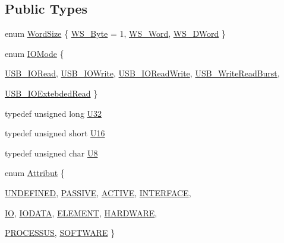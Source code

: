 \subsection*{Public Types}
\begin{DoxyCompactItemize}
\item 
enum \hyperlink{classUsbFTMLInterface_ae0f25daa336091a5acd548aef3e9b4b4}{WordSize} \{ \hyperlink{classUsbFTMLInterface_ae0f25daa336091a5acd548aef3e9b4b4a6d1f2c03dd60649290649efd7fb7f57d}{WS\_\-Byte} = 1, 
\hyperlink{classUsbFTMLInterface_ae0f25daa336091a5acd548aef3e9b4b4adcfe42e171e84db403d40614f2502f3e}{WS\_\-Word}, 
\hyperlink{classUsbFTMLInterface_ae0f25daa336091a5acd548aef3e9b4b4abff203c40a75d695acbf9190ae2dbe69}{WS\_\-DWord}
 \}
\item 
enum \hyperlink{classUsbFTMLInterface_a181227ebb27454964e5b6d185432498d}{IOMode} \{ \par
\hyperlink{classUsbFTMLInterface_a181227ebb27454964e5b6d185432498da71463bc1f4116a7456f7f298d030ecc7}{USB\_\-IORead}, 
\hyperlink{classUsbFTMLInterface_a181227ebb27454964e5b6d185432498daa9295e3a8e1c21709afd36f4405b346b}{USB\_\-IOWrite}, 
\hyperlink{classUsbFTMLInterface_a181227ebb27454964e5b6d185432498dae7dbd66b9634d787979e1b081defc297}{USB\_\-IOReadWrite}, 
\hyperlink{classUsbFTMLInterface_a181227ebb27454964e5b6d185432498da9c6732d74013c323f7d0346793ea105c}{USB\_\-WriteReadBurst}, 
\par
\hyperlink{classUsbFTMLInterface_a181227ebb27454964e5b6d185432498dab677684fb0f754cbca04824b202d8ebe}{USB\_\-IOExtebdedRead}
 \}
\item 
typedef unsigned long \hyperlink{classUsbFTMLInterface_a142f8ce4b5873c295af8945f3894ae38}{U32}
\item 
typedef unsigned short \hyperlink{classUsbFTMLInterface_a5909beb462dc45c772d6f7ae79312ad7}{U16}
\item 
typedef unsigned char \hyperlink{classUsbFTMLInterface_af7c9f02ee6f59fefa68ef14f90dcbbd8}{U8}
\item 
enum \hyperlink{classAttrib_a69e171d7cc6417835a5a306d3c764235}{Attribut} \{ \par
\hyperlink{classAttrib_a69e171d7cc6417835a5a306d3c764235a3a8da2ab97dda18aebab196fe4100531}{UNDEFINED}, 
\hyperlink{classAttrib_a69e171d7cc6417835a5a306d3c764235a2bfb2af57b87031d190a05fe25dd92ed}{PASSIVE}, 
\hyperlink{classAttrib_a69e171d7cc6417835a5a306d3c764235a3b1fec929c0370d1436f2f06e298fb0d}{ACTIVE}, 
\hyperlink{classAttrib_a69e171d7cc6417835a5a306d3c764235aa27c16b480a369ea4d18b07b2516bbc7}{INTERFACE}, 
\par
\hyperlink{classAttrib_a69e171d7cc6417835a5a306d3c764235a1420a5b8c0540b2af210b6975eded7f9}{IO}, 
\hyperlink{classAttrib_a69e171d7cc6417835a5a306d3c764235a0af3b0d0ac323c1704e6c69cf90add28}{IODATA}, 
\hyperlink{classAttrib_a69e171d7cc6417835a5a306d3c764235a7788bc5dd333fd8ce18562b269c9dab1}{ELEMENT}, 
\hyperlink{classAttrib_a69e171d7cc6417835a5a306d3c764235a61ceb22149f365f1780d18f9d1459423}{HARDWARE}, 
\par
\hyperlink{classAttrib_a69e171d7cc6417835a5a306d3c764235a75250e29692496e73effca2c0330977f}{PROCESSUS}, 
\hyperlink{classAttrib_a69e171d7cc6417835a5a306d3c764235a103a67cd0b8f07ef478fa45d4356e27b}{SOFTWARE}
 \}
\end{DoxyCompactItemize}
